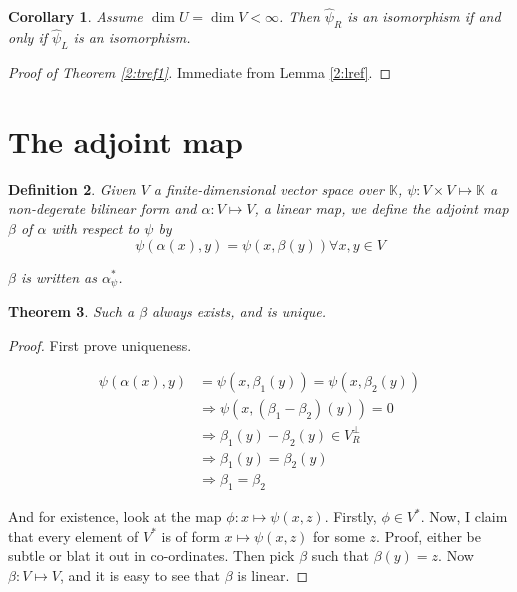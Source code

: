 \documentclass{notes}
\theoremstyle{plain}
\newtheorem{theorem}{Theorem}[chapter]
\newtheorem{corollary}[theorem]{Corollary}
\newtheorem{definition}[theorem]{Definition}
\begin{document}
\begin{corollary}
  Assume $\dim U = \dim V < \infty$.  Then $\widehat{\psi}_{R}$ is an
  isomorphism if and only if $\widehat{\psi}_{L}$ is an isomorphism.
\end{corollary}

\begin{proof}[Proof of Theorem \ref{2:tref1}]
  Immediate from Lemma \ref{2:lref}.
\end{proof}

\section{The adjoint map}

\begin{definition}
  Given $V$ a finite-dimensional vector space over $\mathbb{K}$, $\psi
  : V \times V \mapsto \mathbb{K}$ a non-degerate bilinear form and
  $\alpha : V \mapsto V$, a linear map, we define the \emph{adjoint
    map} $\beta$ of $\alpha$ with respect to $\psi$ by
\[
\psi(\alpha(x),y)=\psi(x,\beta(y)) \forall x,y \in V
\]

$\beta$ is written as $\alpha^{*}_{\psi}$.

\end{definition}

\begin{theorem}
  Such a $\beta$ always exists, and is unique.
\end{theorem}

\begin{proof}
  First prove uniqueness.

\begin{align*}
  \psi(\alpha(x),y) &= \psi(x,\beta_1(y)) = \psi(x,\beta_2(y)) \\
  &\Rightarrow \psi(x,(\beta_1-\beta_2)(y)) = 0 \\
  &\Rightarrow \beta_1(y)-\beta_2(y) \in V^{\perp}_{R} \\
  &\Rightarrow \beta_1(y)=\beta_2(y) \\
  &\Rightarrow \beta_1=\beta_2
\end{align*}

And for existence, look at the map $\phi : x \mapsto \psi(x,z)$.
Firstly, $\phi \in V^{*}$.  Now, I claim that every element of $V^*$
is of form $x \mapsto \psi(x,z)$ for some $z$.  Proof, either be
subtle or blat it out in co-ordinates.  Then pick $\beta$ such that
$\beta(y)=z$.  Now $\beta : V \mapsto V$, and it is easy to see that
$\beta$ is linear.
\end{proof}
\end{document}
